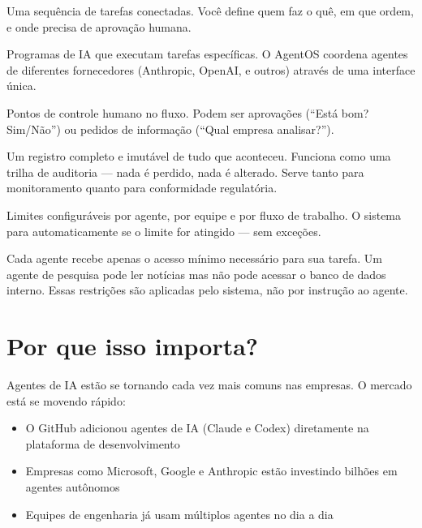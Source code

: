 \documentclass[12pt, a4paper]{article}
\begin{document}
\begin{description}[style=nextline, leftmargin=1.5em]
    \item[\textnormal{\textbf{Fluxo de trabalho (Workflow)}}] Uma sequência de tarefas conectadas. Você define quem faz o quê, em que ordem, e onde precisa de aprovação humana.

    \item[\textnormal{\textbf{Agentes}}] Programas de IA que executam tarefas específicas. O AgentOS coordena agentes de diferentes fornecedores (Anthropic, OpenAI, e outros) através de uma interface única.

    \item[\textnormal{\textbf{Gates (Portões de aprovação)}}] Pontos de controle humano no fluxo. Podem ser aprovações (``Está bom? Sim/Não'') ou pedidos de informação (``Qual empresa analisar?'').

    \item[\textnormal{\textbf{Log de eventos}}] Um registro completo e imutável de tudo que aconteceu. Funciona como uma trilha de auditoria --- nada é perdido, nada é alterado. Serve tanto para monitoramento quanto para conformidade regulatória.

    \item[\textnormal{\textbf{Orçamento}}] Limites configuráveis por agente, por equipe e por fluxo de trabalho. O sistema para automaticamente se o limite for atingido --- sem exceções.

    \item[\textnormal{\textbf{Permissões}}] Cada agente recebe apenas o acesso mínimo necessário para sua tarefa. Um agente de pesquisa pode ler notícias mas não pode acessar o banco de dados interno. Essas restrições são aplicadas pelo sistema, não por instrução ao agente.
\end{description}

\section{Por que isso importa?}

Agentes de IA estão se tornando cada vez mais comuns nas empresas. O mercado está se movendo rápido:

\begin{itemize}[leftmargin=1.5em]
    \item O GitHub adicionou agentes de IA (Claude e Codex) diretamente na plataforma de desenvolvimento
    \item Empresas como Microsoft, Google e Anthropic estão investindo bilhões em agentes autônomos
    \item Equipes de engenharia já usam múltiplos agentes no dia a dia
\end{itemize}
\end{document}
